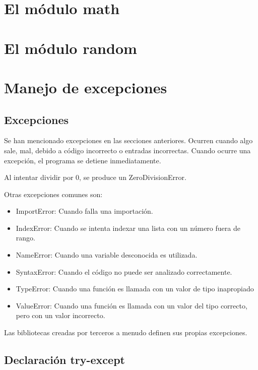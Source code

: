 \documentclass{report}
\begin{document}
\clearpage\chapter{El módulo math}

\clearpage\chapter{El módulo random}

\clearpage\chapter{Manejo de excepciones}

\section{Excepciones}

Se han mencionado excepciones en las secciones anteriores. Ocurren cuando algo sale, mal, debido a código incorrecto o entradas incorrectas. Cuando ocurre una excepción, el programa se detiene inmediatamente.

Al intentar dividir por 0, se produce un ZeroDivisionError.


Otras excepciones comunes son:

\begin{itemize}
  \item ImportError: Cuando falla una importación.
  \item IndexError: Cuando se intenta indexar una lista con un número fuera de rango.
  \item NameError: Cuando una variable desconocida es utilizada.
  \item SyntaxError: Cuando el código no puede ser analizado correctamente.
  \item TypeError: Cuando una función es llamada con un valor de tipo inapropiado
  \item ValueError: Cuando una función es llamada con un valor del tipo correcto, pero con un valor incorrecto.
\end{itemize}

Las bibliotecas creadas por terceros a menudo definen sus propias excepciones.

\section{Declaración try-except}
\end{document}
